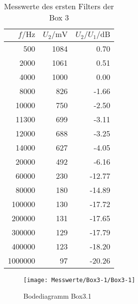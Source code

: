 \documentclass[a4paper, 12pt]{article}
\begin{document}
\begin{table}[H]
  \begin{center}
    \begin{tabular}{@{}rrr@{}}
      \toprule
      $f / \si{\hertz}$ & $U_2 / \si{\milli\volt}$ & $U_2/U_1 / \si{\deci\bel}$ \\ \midrule
      500               & 1084                     & 0.70                       \\
      2000              & 1061                     & 0.51                       \\
      4000              & 1000                     & 0.00                       \\
      8000              & 826                      & -1.66                      \\
      10000             & 750                      & -2.50                      \\
      11300             & 699                      & -3.11                      \\
      12000             & 688                      & -3.25                      \\
      14000             & 627                      & -4.05                      \\
      20000             & 492                      & -6.16                      \\
      60000             & 230                      & -12.77                     \\
      80000             & 180                      & -14.89                     \\
      100000            & 130                      & -17.72                     \\
      200000            & 131                      & -17.65                     \\
      300000            & 129                      & -17.79                     \\
      400000            & 123                      & -18.20                     \\
      1000000           & 97                       & -20.26                     \\ \bottomrule
    \end{tabular}
    \end{center}
    \caption{Messwerte des ersten Filters der Box 3}
\end{table}

\begin{figure}[H]
	\texttt{[image: Messwerte/Box3-1/Box3-1]}
  \caption{Bodediagramm Box3.1}
\end{figure}
\end{document}
